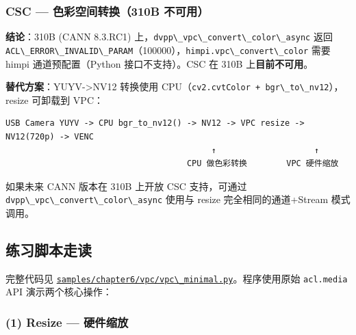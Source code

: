 \subsubsection{CSC --- 色彩空间转换（310B 不可用）}\label{vpc-csc}

\textbf{结论}：310B (CANN 8.3.RC1)
上，\passthrough{\lstinline!dvpp\_vpc\_convert\_color\_async!} 返回
\passthrough{\lstinline!ACL\_ERROR\_INVALID\_PARAM!}（100000），\passthrough{\lstinline!himpi.vpc\_convert\_color!}
需要 himpi 通道预配置（Python 接口不支持）。CSC 在 310B
上\textbf{目前不可用}。

\textbf{替代方案}：YUYV-\textgreater NV12 转换使用
CPU（\passthrough{\lstinline!cv2.cvtColor + bgr\_to\_nv12!}），resize
可卸载到 VPC：

\begin{lstlisting}
USB Camera YUYV -> CPU bgr_to_nv12() -> NV12 -> VPC resize -> NV12(720p) -> VENC
                                          ↑                    ↑
                                     CPU 做色彩转换        VPC 硬件缩放
\end{lstlisting}

如果未来 CANN 版本在 310B 上开放 CSC 支持，可通过
\passthrough{\lstinline!dvpp\_vpc\_convert\_color\_async!} 使用与 resize
完全相同的通道+Stream 模式调用。

\subsection{练习脚本走读}\label{src-book-chapter6-h95}

完整代码见
\href{https://github.com/zhouxzh/Ascend310/blob/master/samples/chapter6/vpc/vpc_minimal.py}{\passthrough{\lstinline!samples/chapter6/vpc/vpc\_minimal.py!}}。程序使用原始
\passthrough{\lstinline!acl.media!} API 演示两个核心操作：

\subsubsection{(1) Resize --- 硬件缩放}\label{src-book-chapter6-h96}

